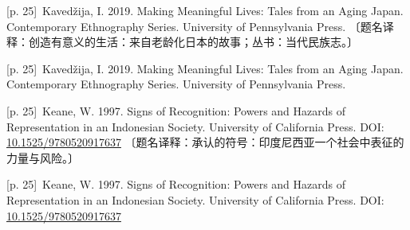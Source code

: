 \documentclass[10pt,a4paper]{article}
\begin{document}
\noindent\begin{minipage}{\textwidth}\begin{minipage}[t]{\dimexpr.5\textwidth-4mm\relax}\noindent\begin{minipage}[t]{\linewidth}{\scriptsize\color{gray} [p. 25]}\ Kavedžija, I. 2019. Making Meaningful Lives: Tales from an Aging Japan. Contemporary Ethnography Series. University of Pennsylvania Press. 〔题名译释：创造有意义的生活：来自老龄化日本的故事；丛书：当代民族志。〕\par\end{minipage}\par\end{minipage}\hfill\begin{minipage}[t]{\dimexpr.5\textwidth-4mm\relax}\noindent\begin{minipage}[t]{\linewidth}{\scriptsize\color{gray} [p. 25]}\ Kavedžija, I. 2019. Making Meaningful Lives: Tales from an Aging Japan. Contemporary Ethnography Series. University of Pennsylvania Press.\par\end{minipage}\par\end{minipage}\end{minipage}\par
\noindent\begin{minipage}{\textwidth}\begin{minipage}[t]{\dimexpr.5\textwidth-4mm\relax}\noindent\begin{minipage}[t]{\linewidth}{\scriptsize\color{gray} [p. 25]}\ Keane, W. 1997. Signs of Recognition: Powers and Hazards of Representation in an Indonesian Society. University of California Press. DOI: \url{10.1525/9780520917637} 〔题名译释：承认的符号：印度尼西亚一个社会中表征的力量与风险。〕\par\end{minipage}\par\end{minipage}\hfill\begin{minipage}[t]{\dimexpr.5\textwidth-4mm\relax}\noindent\begin{minipage}[t]{\linewidth}{\scriptsize\color{gray} [p. 25]}\ Keane, W. 1997. Signs of Recognition: Powers and Hazards of Representation in an Indonesian Society. University of California Press. DOI: \url{10.1525/9780520917637}\par\end{minipage}\par\end{minipage}\end{minipage}\par
\end{document}
